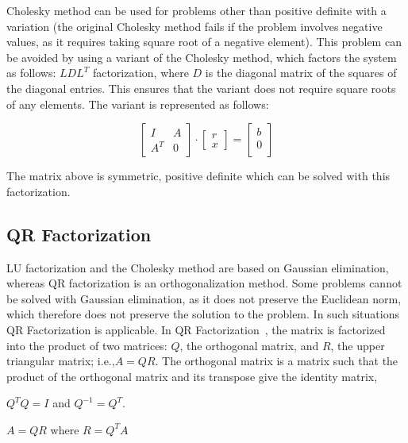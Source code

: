 Cholesky method can be used for problems other than positive definite with a variation (the original Cholesky method fails if the problem involves negative values, as it requires taking square root of a negative element).
This problem can be avoided by using a variant of the Cholesky method, which factors the system as follows: $LDL^{T}$ factorization, where $D$ is the diagonal matrix of the squares of the diagonal entries. This ensures that the variant does not require square roots of any elements. The variant is represented as follows: 

\[
\begin{bmatrix}
    I     & A \\
    A^{T} & 0 
\end{bmatrix}
\cdot
\begin{bmatrix}
    r \\
    x 
\end{bmatrix}
=
\begin{bmatrix}
    b \\
    0 \\
\end{bmatrix}
\]


The matrix above is symmetric, positive definite which can be solved with this factorization. 

\subsection{QR Factorization}
LU factorization and the Cholesky method are based on Gaussian elimination, whereas QR factorization is an orthogonalization method. Some problems cannot be solved with Gaussian elimination, as it does not preserve the Euclidean norm, which therefore does not preserve the solution to the problem. In such situations QR Factorization is applicable. In QR Factorization~\cite{qr}, the matrix is factorized into the product of two matrices: $Q$, the orthogonal matrix, and $R$, the upper triangular matrix; i.e.,$A = QR$. The orthogonal matrix is a matrix such that the product of the orthogonal matrix and its transpose give the identity matrix, 
\begin{center}
$Q^{T}Q = I$ and $Q^{-1} = Q^{T}$. 


$A = QR$ where $R = Q^{T}A$

\end{center}

